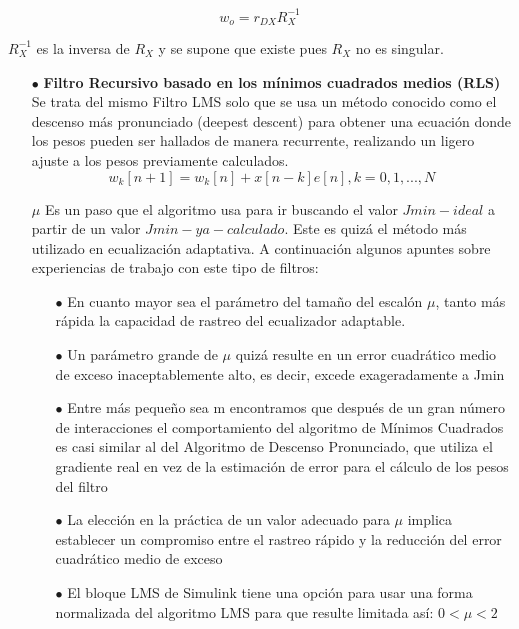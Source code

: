 \begin{equation} \label{capcuatro_cincuentaydos}
	 w_{o}= r_{DX}R_{X}^{-1}
\end{equation}

$R_X^{-1}$ es la inversa de $R_X$ y se supone que existe pues $R_X$ no es singular.

\begin{itemize}
	\item [$\bullet$] \textbf{Filtro Recursivo basado en los mínimos cuadrados medios (RLS)} \\
	
	Se trata del mismo Filtro LMS solo que se usa un método conocido como el descenso más pronunciado (deepest descent) para obtener una ecuación donde los pesos pueden ser hallados de manera recurrente, realizando un ligero ajuste a los pesos previamente calculados. \\
	
	\begin{equation} \label{capcuatro_cincuentaytres}
		 w_k [n+1]=w_k[n]+x[n-k] e[n], k=0,1,...,N
    \end{equation}

$ \mu$ Es un paso que el algoritmo usa para ir buscando el valor $Jmin-ideal$ a partir de un valor $Jmin-ya-calculado$.
Este es quizá el método más utilizado en ecualización adaptativa. A continuación algunos apuntes sobre experiencias de trabajo con este tipo de filtros:

\begin{itemize}
	\item [$\bullet$] En cuanto mayor sea el parámetro del tamaño del escalón $\mu$, tanto más rápida la capacidad de rastreo del ecualizador adaptable.
	\item [$\bullet$] Un parámetro grande de $\mu$   quizá resulte en un error cuadrático medio de exceso inaceptablemente alto, es decir, excede exageradamente a Jmin
	\item [$\bullet$] Entre más pequeño sea m encontramos que después de un gran número de interacciones el comportamiento del algoritmo de Mínimos Cuadrados es casi similar al del Algoritmo de Descenso Pronunciado, que utiliza el gradiente real en vez de la estimación de error para el cálculo de los pesos del filtro
	\item [$\bullet$] La elección en la práctica de un valor adecuado para $\mu$ implica establecer un compromiso entre el rastreo rápido y la reducción del error cuadrático medio de exceso
	\item [$\bullet$] El bloque LMS de Simulink tiene una opción para usar una forma normalizada del algoritmo LMS para que  resulte limitada así: $0<\mu <2$	
\end{itemize}
\end{itemize}

